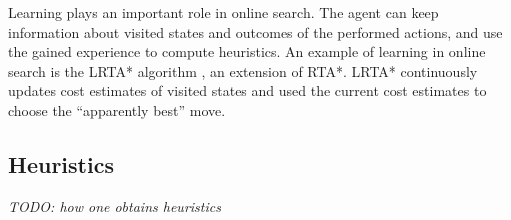 Learning plays an important role in online search. The agent can keep
information about visited states and outcomes of the performed
actions, and use the gained experience to compute heuristics. An
example of learning in online search is the LRTA* algorithm
\cite{Korf.rta}, an extension of RTA*. LRTA* continuously
updates cost estimates of visited states and used the current cost
estimates to choose the ``apparently best'' move.

\subsection{Heuristics}

\emph{TODO: how one obtains heuristics}
